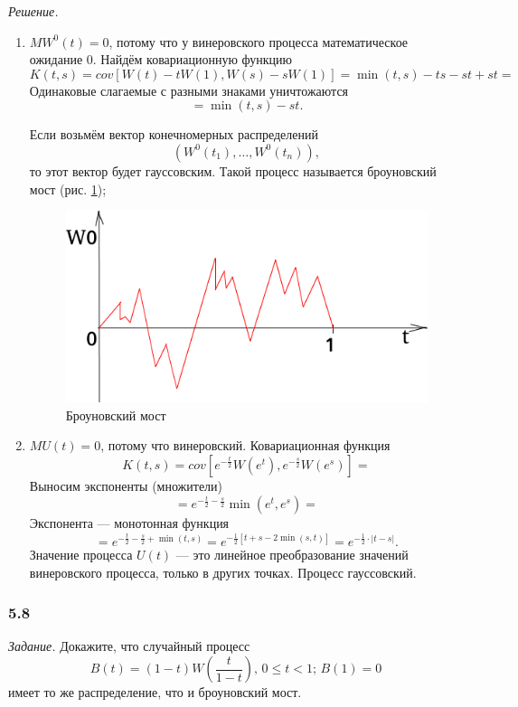 \textit{Решение.}
\begin{enumerate}[label=\alph*)]
  \item $MW^0 \left( t \right) = 0$, потому что у винеровского процесса математическое ожидание 0.
  Найдём ковариационную функцию
  $$K \left( t, s \right) =
    cov \left[
      W \left( t \right) - tW \left( 1 \right), W \left( s \right) - sW \left( 1 \right) \right] =
    \min \left( t, s \right) - ts - st + st =$$
  Одинаковые слагаемые с разными знаками уничтожаются
  $$= \min \left( t, s \right) - st.$$

  Если возьмём вектор конечномерных распределений
  $$ \left( W^0 \left( t_1 \right), \dotsc, W^0 \left( t_n \right) \right),$$
  то этот вектор будет гауссовским.
  Такой процесс называется броуновский мост (рис. \ref{fig:57});

  \begin{figure}[h!]
    \centering
    \includegraphics[width=.4\textwidth]{./pictures/5_7.png}
    \caption{Броуновский мост}
    \label{fig:57}
  \end{figure}

  \item $MU \left( t \right) = 0$, потому что винеровский.
  Ковариационная функция
  $$K \left( t, s \right) =
    cov \left[
      e^{-\frac{t}{2}} W \left( e^t \right), e^{-\frac{s}{2}} W \left( e^s \right) \right] =$$
  Выносим экспоненты (множители)
  $$= e^{-\frac{t}{2} - \frac{s}{2}} \min \left( e^t, e^s \right) =$$
  Экспонента --- монотонная функция
  $$= e^{-\frac{t}{2} - \frac{s}{2} + \min \left( t, s \right) } =
    e^{-\frac{1}{2} \left[ t + s - 2 \min \left( s, t \right) \right] } =
    e^{-\frac{1}{2} \cdot \left| t - s \right| }.$$
  Значение процесса $U \left( t \right) $ ---
  это линейное преобразование значений винеровского процесса, только в других точках.
  Процесс гауссовский.
\end{enumerate}

\subsubsection*{5.8}

\textit{Задание.}
Докажите, что случайный процесс
$$B \left( t \right) = \left( 1 - t \right) W \left( \frac{t}{1 - t} \right), \,
  0 \leq t < 1; \,
  B \left( 1 \right) = 0$$
имеет то же распределение, что и броуновский мост.

